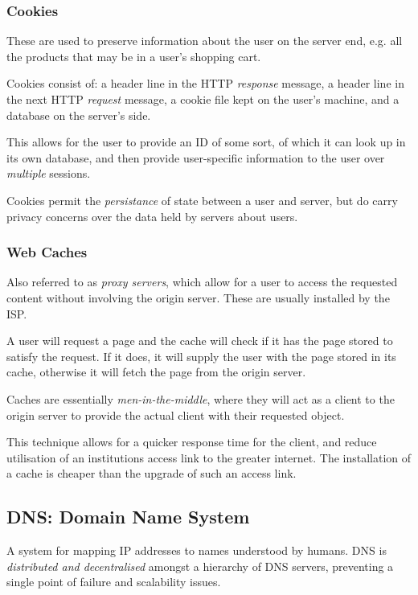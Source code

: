 \documentclass{article}
\begin{document}
\subsubsection{Cookies}

These are used to preserve information about the user on the server end, e.g. all the products that may be in a user's shopping cart.

Cookies consist of: a header line in the HTTP \textit{response} message, a header line in the next HTTP \textit{request} message, a cookie file kept on the user's machine, and a database on the server's side.

This allows for the user to provide an ID of some sort, of which it can look up in its own database, and then provide user-specific information to the user over \textit{multiple} sessions.

Cookies permit the \textit{persistance} of state between a user and server, but do carry privacy concerns over the data held by servers about users.

\subsubsection{Web Caches}

Also referred to as \textit{proxy servers}, which allow for a user to access the requested content without involving the origin server. These are usually installed by the ISP.

A user will request a page and the cache will check if it has the page stored to satisfy the request. If it does, it will supply the user with the page stored in its cache, otherwise it will fetch the page from the origin server.

Caches are essentially \textit{men-in-the-middle}, where they will act as a client to the origin server to provide the actual client with their requested object.

This technique allows for a quicker response time for the client, and reduce utilisation of an institutions access link to the greater internet. The installation of a cache is cheaper than the upgrade of such an access link.

\subsection{DNS: Domain Name System}

A system for mapping IP addresses to names understood by humans. DNS is \textit{distributed and decentralised} amongst a hierarchy of DNS servers, preventing a single point of failure and scalability issues.
\end{document}
